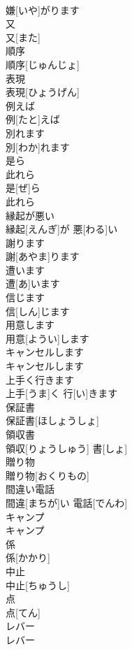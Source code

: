 \documentclass[8pt]{extreport}
\begin{document}
\begin{CJK}{UTF8}{min}
\\	嫌[いや]がります	
\\	又	
\\	又[また]	
\\	順序	
\\	順序[じゅんじょ]	
\\	表現	
\\	表現[ひょうげん]	
\\	例えば	
\\	例[たと]えば	
\\	別れます	
\\	別[わか]れます	
\\	是ら
\\	此れら	
\\	是[ぜ]ら
\\	此れら	
\\	縁起が悪い	
\\	縁起[えんぎ]が 悪[わる]い	
\\	謝ります	
\\	謝[あやま]ります	
\\	遭います	
\\	遭[あ]います	
\\	信じます	
\\	信[しん]じます	
\\	用意します	
\\	用意[ようい]します	
\\	キャンセルします	
\\	キャンセルします	
\\	上手く行きます	
\\	上手[うま]く 行[い]きます	
\\	保証書	
\\	保証書[ほしょうしょ]	
\\	領収書	
\\	領収[りょうしゅう] 書[しょ]	
\\	贈り物	
\\	贈り物[おくりもの]	
\\	間違い電話	
\\	間違[まちが]い 電話[でんわ]	
\\	キャンプ	
\\	キャンプ	
\\	係	
\\	係[かかり]	
\\	中止	
\\	中止[ちゅうし]	
\\	点	
\\	点[てん]	
\\	レバー	
\\	レバー	

\end{CJK}
\end{document}
